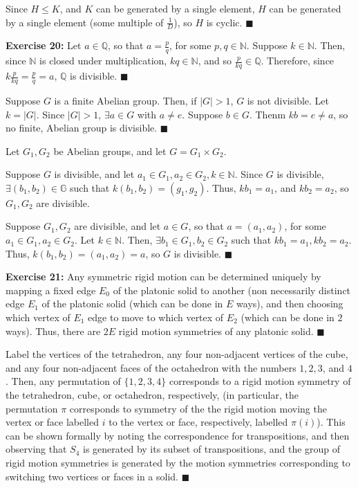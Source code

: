 \documentclass{article}%
\begin{document}
Since $H \leq K$, and $K$ can be generated by a single element, $H$ can be
generated by a single element (some multiple of $\frac{1}{D}$), so $H$ is
cyclic. \qquad $\blacksquare$

\textbf{Exercise 20:} Let $a \in \mathbb{Q}$, so that $a = \frac{p}{q}$, for
some $p, q \in \mathbb{N}$. Suppose $k \in \mathbb{N}$. Then, since
$\mathbb{N}$ is closed under multiplication, $kq \in \mathbb{N}$, and so
$\frac{p}{kq} \in \mathbb{Q}$. Therefore, since $k\frac{p}{kq} = \frac{p}{q}
 = a$, $\mathbb{Q}$ is divisible. \qquad $\blacksquare$

Suppose $G$ is a finite Abelian group. Then, if $|G| > 1$, $G$ is not
divisible. Let $k = |G|$. Since $|G| > 1$, $\exists a \in G$ with $a \neq e$.
Suppose $b \in G$. Thenm $kb = e \neq a$, so no finite, Abelian group is
divisible. \qquad $\blacksquare$

Let $G_1, G_2$ be Abelian groups, and let $G = G_1 \times G_2$.

Suppose $G$ is
divisible, and let $a_1 \in G_1, a_2 \in G_2, k \in \mathbb{N}$. Since $G$ is
divisible, $\exists (b_1,b_2) \in \mathbb{G}$ such that $k(b_1,b_2) =
(g_1,g_2)$. Thus, $kb_1 = a_1$, and $kb_2 = a_2$, so $G_1, G_2$ are divisible.

Suppose $G_1, G_2$ are divisible, and let $a \in G$, so that $a = (a_1,a_2)$,
for some $a_1 \in G_1, a_2 \in G_2$. Let $k \in \mathbb{N}$. Then,
$\exists b_1 \in G_1, b_2 \in G_2$ such that $kb_1 = a_1, kb_2 = a_2$. Thus,
$k(b_1,b_2) = (a_1,a_2) = a$, so $G$ is divisible. \qquad $\blacksquare$

\textbf{Exercise 21:} Any symmetric rigid motion can be determined uniquely by
mapping a fixed edge $E_0$ of the platonic solid to another (non necessarily
distinct edge $E_1$ of the platonic solid (which can be done in $E$ ways), and
then choosing which vertex of $E_1$ edge to move to which vertex of $E_2$
(which can be done in $2$ ways). Thus, there are $2E$ rigid motion symmetries
of any platonic solid. \qquad $\blacksquare$

Label the vertices of the tetrahedron, any four non-adjacent vertices of the
cube, and any four non-adjacent faces of the octahedron with the numbers $1,
2, 3$, and $4$. Then, any permutation of $\{1, 2, 3, 4\}$ corresponds to a
rigid motion symmetry of the tetrahedron, cube, or octahedron, respectively,
(in particular, the permutation $\pi$ corresponds to symmetry of the the rigid
motion moving the vertex or face labelled $i$ to the vertex or face,
respectively, labelled $\pi(i)$). This can be shown formally by noting the
correspondence for transpositions, and then observing that $S_4$ is
generated by its subset of transpositions, and the group of rigid motion
symmetries is generated by the motion symmetries corresponding to switching
two vertices or faces in a solid. \qquad $\blacksquare$
\end{document}
